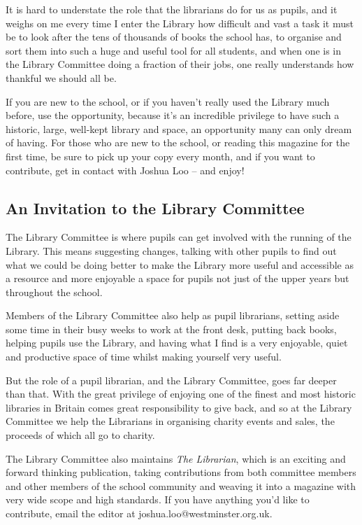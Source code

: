 \documentclass[12pt,a4paper]{report}
\begin{document}
\begin{multicols}{2}
\begin{multicols}{2}
It is hard to understate the role that the librarians do for us as pupils, and it weighs on me every time I enter the Library how difficult and vast a task it must be to look after the tens of thousands of books the school has, to organise and sort them into such a huge and useful tool for all students, and when one is in the Library Committee doing a fraction of their jobs, one really understands how thankful we should all be.

If you are new to the school, or if you haven’t really used the Library much before, use the opportunity, because it’s an incredible privilege to have such a historic, large, well-kept library and space, an opportunity many can only dream of having. For those who are new to the school, or reading this magazine for the first time, be sure to pick up your copy every month, and if you want to contribute, get in contact with Joshua Loo – and enjoy!

\subsection{An Invitation to the Library Committee}

The Library Committee is where pupils can get involved with the running of the Library. This means suggesting changes, talking with other pupils to find out what we could be doing better to make the Library more useful and accessible as a resource and more enjoyable a space for pupils not just of the upper years but throughout the school.

Members of the Library Committee also help as pupil librarians, setting aside some time in their busy weeks to work at the front desk, putting back books, helping pupils use the Library, and having what I find is a very enjoyable, quiet and productive space of time whilst making yourself very useful.

But the role of a pupil librarian, and the Library Committee, goes far deeper than that. With the great privilege of enjoying one of the finest and most historic libraries in Britain comes great responsibility to give back, and so at the Library Committee we help the Librarians in organising charity events and sales, the proceeds of which all go to charity.

The Library Committee also maintains \textit{The Librarian}, which is an exciting and forward thinking publication, taking contributions from both committee members and other members of the school community and weaving it into a magazine with very wide scope and high standards. If you have anything you’d like to contribute, email the editor at joshua.loo@westminster.org.uk.


\end{multicols}
\end{multicols}
\end{document}
